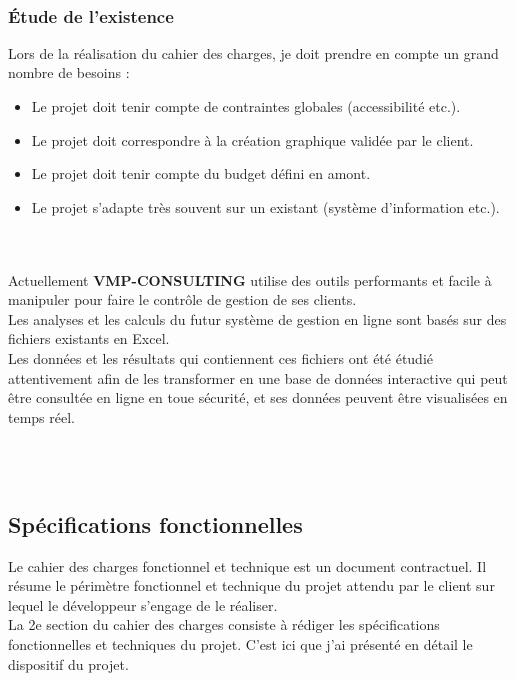 \documentclass[12pt]{article}
\begin{document}
\\



\subsubsection{Étude de l’existence}

Lors de la réalisation du cahier des charges, je doit prendre en compte un grand nombre de besoins :
\begin{itemize}



\item Le projet doit tenir compte de contraintes globales (accessibilité etc.).

\item Le projet doit correspondre à la création graphique validée par le client.

 \item Le projet doit tenir compte du budget défini en amont.

 \item   Le projet s’adapte très souvent sur un existant (système d’information etc.).

\end{itemize} \\
\\

Actuellement \textbf{VMP-CONSULTING} utilise  des outils performants et facile à manipuler 
pour faire le contrôle de gestion de ses clients.\\
Les analyses et les calculs du futur système de gestion en ligne sont basés
sur des fichiers existants en Excel.\\

Les données et les résultats qui contiennent ces fichiers ont été étudié attentivement afin de les transformer en  une base de données interactive qui peut être consultée en ligne en toue sécurité, et ses données peuvent être visualisées en temps réel.

\\
\\



 




\subsection{ Spécifications fonctionnelles}


Le cahier des charges fonctionnel et technique est un document contractuel. Il résume le périmètre fonctionnel et technique du projet attendu par le client sur lequel le développeur s’engage de le réaliser.\\
La 2e section du cahier des charges consiste à rédiger les spécifications fonctionnelles et techniques du projet. C’est ici que j'ai  présenté en détail le dispositif du projet. \\
\end{document}
